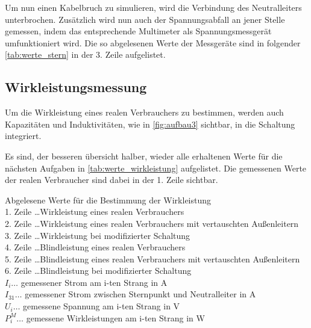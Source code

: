 \documentclass[12pt,english,ngerman]{scrartcl}
\begin{document}
Um nun einen Kabelbruch zu simulieren, wird die Verbindung des Neutralleiters
unterbrochen. Zusätzlich wird nun auch der Spannungsabfall an jener Stelle
gemessen, indem das entsprechende Multimeter als Spannungsmessgerät
umfunktioniert wird. Die so abgelesenen Werte der Messgeräte sind in folgender
\autoref{tab:werte_stern} in der 3. Zeile aufgelistet.

\subsection{Wirkleistungsmessung}
Um die Wirkleistung eines realen Verbrauchers zu bestimmen, werden auch
Kapazitäten und Induktivitäten, wie in \autoref{fig:aufbau3} sichtbar, in die
Schaltung integriert.

Es sind, der besseren übersicht halber, wieder alle erhaltenen Werte für die
nächsten Aufgaben in \autoref{tab:werte_wirkleistung} aufgelistet. Die
gemessenen Werte der realen Verbraucher sind dabei in der 1. Zeile sichtbar.

\begin{table}[H]
	\caption[Abgelesene Werte für die Bestimmung der Wirkleistung] {Abgelesene Werte für die
		Bestimmung der Wirkleistung                                                \\
		1. Zeile \dots Wirkleistung eines realen Verbrauchers                      \\
		2. Zeile \dots Wirkleistung eines realen Verbrauchers mit vertauschten
		Außenleitern                                                               \\
		3. Zeile \dots Wirkleistung bei modifizierter Schaltung                    \\
		4. Zeile \dots Blindleistung eines realen Verbrauchers                     \\
		5. Zeile \dots Blindleistung eines realen Verbrauchers mit vertauschten
		Außenleitern                                                               \\
		6. Zeile \dots Blindleistung bei modifizierter Schaltung                   \\
		$I_i \dots$ gemessener Strom am i-ten Strang in A                          \\
		$I_{31} \dots$ gemessener Strom zwischen Sternpunkt und Neutralleiter in A \\
		$U_{i} \dots$ gemessene Spannung am i-ten Strang in V                      \\
		$P_{i}^M \dots$ gemessene Wirkleistungen am i-ten Strang in W
	}\label{tab:werte_wirkleistung}
	\centering
	
	
\end{table}
\end{document}
